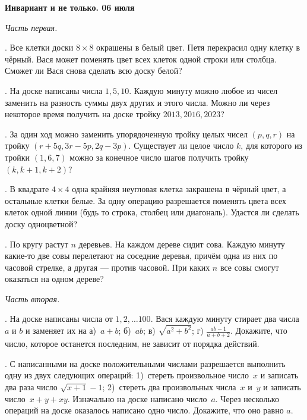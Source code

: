 \begin{center}
\Large
\textbf{Инвариант и не только. 06 июля}
\end{center}


\bigskip
\large
{\it Часть первая.}

\bigskip

. Все клетки доски $8\times 8$ окрашены в белый цвет. Петя перекрасил одну клетку в чёрный. Вася может поменять цвет всех клеток одной строки или столбца. Сможет ли Вася снова сделать всю доску белой?

. На доске написаны числа $1, 5, 10$. Каждую минуту можно любое из чисел заменить на разность суммы двух других и этого числа. Можно ли через некоторое время получить на доске тройку $2013, 2016, 2023$?

. За один ход можно заменить упорядоченную тройку целых чисел
$(p, q, r)$ на тройку $(r+5q, 3r-5p, 2q-3p)$. Существует ли целое число $k$, 
для которого из тройки $(1, 6, 7)$ можно за конечное число шагов получить 
тройку $(k, k+1, k+2)$? 

. В квадрате $4\times 4$ одна крайняя неугловая клетка закрашена в чёрный цвет, а остальные клетки белые. За одну операцию разрешается поменять цвета всех клеток одной линии (будь то строка, столбец или диагональ). Удастся ли сделать доску одноцветной?

. По кругу растут $n$ деревьев. На каждом дереве сидит сова. Каждую минуту какие-то две совы перелетают на соседние деревья, причём одна из них по часовой стрелке, а другая --- против часовой. При каких $n$ все совы смогут оказаться на одном дереве? 



\bigskip

{\it Часть вторая.}

\bigskip

. На доске написаны числа от $1, 2, \ldots 100$. Вася каждую минуту стирает два числа $a$ и $b$ и заменяет их на а)~$a+b$; б)~$ab$; в) $\sqrt{a^2+b^2}$; г) $\frac{ab-1}{a+b+2}$. Докажите, что число, которое останется последним, не зависит от порядка действий.

. С написанными на доске положительными числами разрешается выполнить одну из двух следующих операций:
1)~стереть произвольное число~$x$ и записать два раза число  $\sqrt{x+1}-1$;
2)~стереть два произвольных числа~$x$ и~$y$ и записать число~$x+y+xy$.
Изначально на доске написано число~$a$.
Через несколько операций на доске оказалось написано одно число. Докажите, что оно равно $a$.


